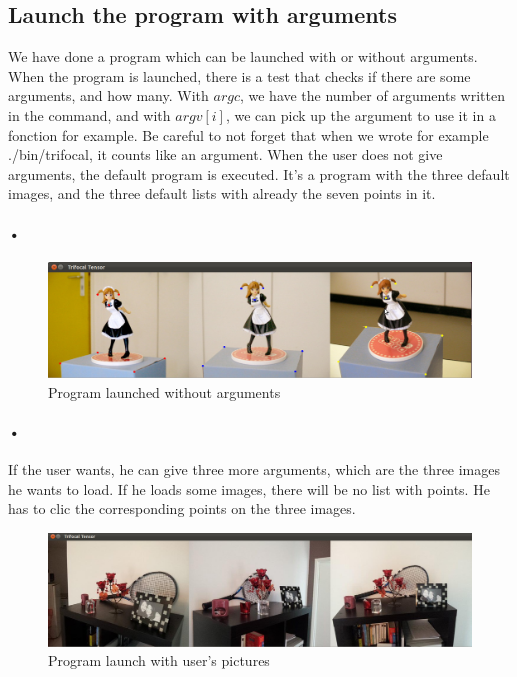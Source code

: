 \documentclass{report}
\begin{document}
\textcolor{subtitle}{\subsection{Launch the program with arguments}}
We have done a program which can be launched with or without arguments. When the program is launched, there is a test that checks if there are some arguments, and how many. With $argc$, we have the number of arguments written in the command, and with $argv[i]$, we can pick up the argument to use it in a fonction for example.
Be careful to not forget that when we wrote for example ./bin/trifocal, it counts like an argument.
When the user does not give arguments, the default program is executed. It's a program with the three default images, and the three default lists with already the seven points in it.
\paragraph{•}
\begin{center}
\begin{figure}[ht]
    \includegraphics[scale=0.4]{defaut.png}
    \caption{Program launched without arguments}
    \label{Picture 1}
\end{figure} 
\end{center}

\paragraph{•}
If the user wants, he can give three more arguments, which are the three images he wants to load. If he loads some images, there will be no list with points. He has to clic the corresponding points on the three images. 


\begin{center}
\begin{figure}[ht]
    \includegraphics[scale=0.334]{images.png}
    \caption{Program launch with user's pictures}
    \label{Picture 2}
\end{figure} 
\end{center}
\end{document}
